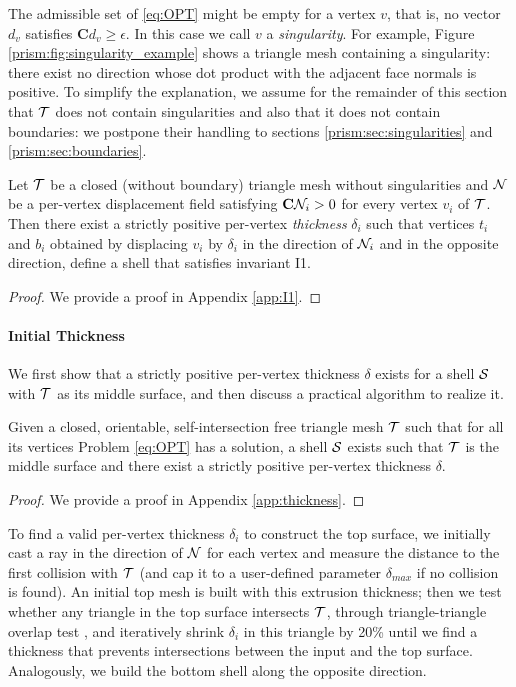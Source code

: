 The admissible set of \eqref{eq:OPT} might be empty for a vertex $v$,
that is, no vector $d_v$ satisfies $\mathbf{C}d_v\geq\epsilon$. 
In this case we call $v$ a \emph{singularity}. For example, Figure \ref{prism:fig:singularity_example} shows a triangle mesh containing a singularity: there exist no direction whose dot product with the adjacent face normals is positive. To simplify the explanation, we assume for the remainder of this section that $\T$ does not contain singularities and also that it does not contain boundaries: we postpone their handling to sections \ref{prism:sec:singularities} and \ref{prism:sec:boundaries}.

\begin{proposition}\label{thm:I1}
Let $\T$ be a closed (without boundary) triangle mesh without singularities and $\N$ be a per-vertex displacement field satisfying $\mathbf{C} \N_i > 0$ for every vertex $v_i$ of $\T$. 
Then there exist a strictly positive per-vertex \emph{thickness} $\delta_i$ such that vertices $t_i$ and $b_i$ obtained by displacing $v_i$ by $\delta_i$ in the direction of $\N_i$ and in the opposite direction, define a shell that satisfies invariant I1.
\end{proposition}
\begin{proof}
We provide a proof in Appendix \ref{app:I1}.
\end{proof}




\paragraph{Initial Thickness}
We first show that a strictly positive per-vertex thickness $\delta$ exists for a shell $\S$ with $\T$ as its middle surface, and then discuss a practical algorithm to realize it.

\begin{theorem}
\label{thm:thickness}
Given a closed, orientable, self-intersection free triangle mesh $\T$ such that for all its vertices  Problem \eqref{eq:OPT} has a solution, a shell $\S$ exists such that $\T$ is the middle surface and there exist a strictly positive per-vertex thickness $\delta$.
\end{theorem}
\begin{proof}
We provide a proof in Appendix \ref{app:thickness}.
\end{proof}


To find a valid per-vertex thickness $\delta_i$ to construct the top surface, we initially cast a ray in the direction of $\N$ for each vertex and measure the distance to the first collision with $\T$ (and cap it to a user-defined parameter $\delta_{max}$ if no collision is found).
An initial top mesh is built with this extrusion thickness; then we test whether any triangle in the top surface intersects $\T$, through triangle-triangle overlap test \cite{guigue2003fast},
and iteratively shrink $\delta_i$ in this triangle by 20\% until we find a thickness that prevents intersections between the input and the top surface. Analogously, we build the bottom shell along the opposite direction. 

